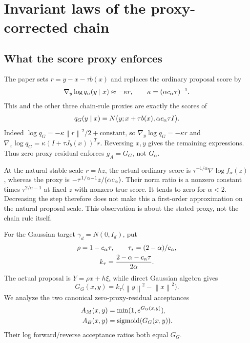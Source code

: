 \documentclass[pdflatex,iicol,sn-mathphys-ay]{sn-jnl}
\theoremstyle{definition}\newtheorem{definition}[theorem]{Definition}
\theoremstyle{remark}\newtheorem{remark}[theorem]{Remark}
\numberwithin{equation}{section}
\newcommand{\norm}[1]{\left\lVert#1\right\rVert}\newcommand{\TV}{\mathrm{TV}}
\newcommand{\1}{\mathbf 1}
\begin{document}
\section{Invariant laws of the proxy-corrected chain}\label{sec:phase}
\subsection{What the score proxy enforces}
The paper sets $r=y-x-\tau b(x)$ and replaces the ordinary proposal score by
\[
\nabla_y\log q_\alpha(y\mid x)\approx-\kappa r,\qquad
\kappa=(\alpha c_\alpha\tau)^{-1}.
\]
This and the other three chain-rule proxies are exactly the scores of
\begin{equation}
q_G(y\mid x)=N\bigl(y;x+\tau b(x),\alpha c_\alpha\tau I\bigr).\label{eq:surrogate}
\end{equation}
Indeed $\log q_G=-\kappa\norm r^2/2+\text{constant}$, so
$\nabla_y\log q_G=-\kappa r$ and
$\nabla_x\log q_G=\kappa(I+\tau J_b(x))^Tr$. Reversing $x,y$ gives the remaining expressions. Thus zero proxy residual enforces $g_A=G_G$, not $G_\alpha$.

At the natural stable scale $r=hz$, the actual ordinary score is
$\tau^{-1/\alpha}\nabla\log f_\alpha(z)$, whereas the proxy is
$-\tau^{1/\alpha-1}z/(\alpha c_\alpha)$. Their norm ratio is a nonzero constant times $\tau^{2/\alpha-1}$ at fixed $z$ with nonzero true score. It tends to zero for $\alpha<2$. Decreasing the step therefore does not make this a first-order approximation on the natural proposal scale. This observation is about the stated proxy, not the chain rule itself.

For the Gaussian target $\gamma_d=N(0,I_d)$, put
\begin{equation}
\begin{gathered}
\rho=1-c_\alpha\tau,\qquad \tau_*=(2-\alpha)/c_\alpha,\\
k_\tau=\frac{2-\alpha-c_\alpha\tau}{2\alpha}.
\end{gathered}
\end{equation}
The actual proposal is $Y=\rho x+h\xi$, while direct Gaussian algebra gives
\begin{equation}
G_G(x,y)=k_\tau\bigl(\norm y^2-\norm x^2\bigr).\label{eq:GG}
\end{equation}
We analyze the two canonical zero-proxy-residual acceptances
\begin{equation}
\begin{aligned}
A_M(x,y)&=\min(1,e^{G_G(x,y)}),\\
A_B(x,y)&=\operatorname{sigmoid}(G_G(x,y)).
\end{aligned}\label{eq:proxyAB}
\end{equation}
Their log forward/reverse acceptance ratios both equal $G_G$.
\end{document}
